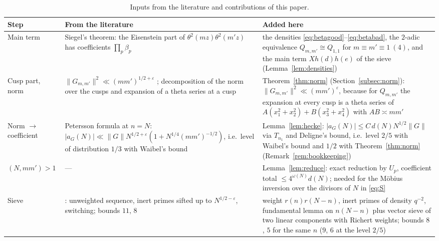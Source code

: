 \documentclass[11pt]{amsart}
\theoremstyle{remark}
\newcommand{\e}{\varepsilon}
\begin{document}
\begin{table}[ht]
\centering
\small
\begin{tabular}{>{\raggedright\arraybackslash}p{}>{\raggedright\arraybackslash}p{}>{\raggedright\arraybackslash}p{}}
\hline
Step & From the literature & Added here\\
\hline
Main term & Siegel's theorem: the Eisenstein part of $\theta^2(mz)\theta^2(m'z)$ has coefficients $\prod_p\beta_p$ \cite{Siegel,Kitaoka,Waibel} & the densities \eqref{eq:betagood}--\eqref{eq:betabad}, the $2$-adic equivalence $Q_{m,m'}\cong Q_{1,1}$ for $m\equiv m'\equiv1\ (4)$, and the main term $Xh(d)h(e)$ of the sieve (Lemma~\ref{lem:densities})\\[2pt]
Cusp part, norm & $\|G_{m,m'}\|^2\ll(mm')^{1/2+\e}$ \cite[Thm.~1]{Waibel}; decomposition of the norm over the cusps and expansion of a theta series at a cusp \cite[(22), Lemma~12]{Waibel} & Theorem~\ref{thm:norm} (Section~\ref{subsec:norm}): $\|G_{m,m'}\|^2\ll(mm')^{\e}$, because for $Q_{m,m'}$ the expansion at every cusp is a theta series of $A(x_1^2+x_2^2)+B(x_3^2+x_4^2)$ with $AB\asymp mm'$\\[2pt]
Norm $\to$ coefficient & Petersson formula at $n=N$: $|a_G(N)|\ll\|G\|N^{1/2+\e}(1+N^{1/4}(mm')^{-1/2})$, i.e.\ level of distribution $1/3$ with Waibel's bound & Lemma~\ref{lem:hecke}: $|a_G(N)|\le C\,d(N)N^{1/2}\|G\|$ via $T_{n_1}$ and Deligne's bound, i.e.\ level $2/5$ with Waibel's bound and $1/2$ with Theorem~\ref{thm:norm} (Remark~\ref{rem:bookkeeping})\\[2pt]
$(N,mm')>1$ & --- & Lemma~\ref{lem:reduce}: exact reduction by $U_p$, coefficient total $\le4^{\omega(N)}d(N)$; needed for the M\"obius inversion over the divisors of $N$ in \eqref{eq:S}\\[2pt]
Sieve & \cite{Chen2}: unweighted sequence, inert primes sifted up to $N^{1/2-\e}$, switching; bounds $11$, $8$ & weight $r(n)r(N-n)$, inert primes of density $q^{-2}$, fundamental lemma on $n(N-n)$ plus vector sieve of two linear components with Richert weights; bounds $8$, $5$ for the same $n$ ($9$, $6$ at the level $2/5$)\\
\hline
\end{tabular}
\medskip
\caption{Inputs from the literature and contributions of this paper.}
\label{tab:compare}
\end{table}
\end{document}
